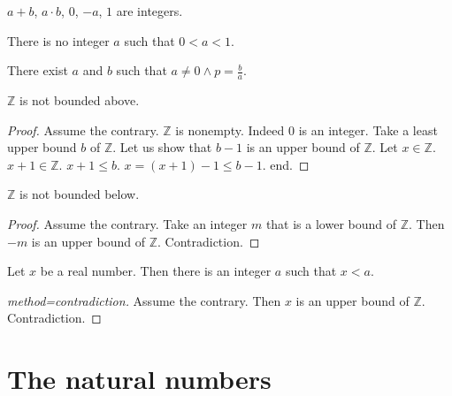 \documentclass{article}
\begin{document}
\begin{forthel}

\begin{axiom}
$a + b$, $a \cdot b$, $0$, $-a$, $1$ are integers.
\end{axiom}

\begin{axiom}
There is no integer $a$ such that $0 < a < 1$.
\end{axiom}

\begin{axiom}
There exist $a$ and $b$ such that
$a \neq 0 \wedge p = \frac{b}{a}$.
\end{axiom}

\begin{theorem}[title=Archimedes 1]
$\mathbb{Z}$ is not bounded above.
\end{theorem}
\begin{proof}
Assume the contrary.
$\mathbb{Z}$ is nonempty. Indeed $0$ is an integer.
Take a least upper bound
$b$ of $\mathbb{Z}$.
Let us show that $b - 1$ is an upper bound of $\mathbb{Z}$.
Let $x \in \mathbb{Z}$. $x + 1 \in \mathbb{Z}$.
$x + 1 \leq b$.
$x = (x + 1) - 1 \leq b - 1$.
end.
\end{proof}

\begin{theorem}
$\mathbb{Z}$ is not bounded below.
\end{theorem}
\begin{proof}
Assume the contrary.
Take an integer $m$ that is a lower bound of $\mathbb{Z}$.
Then $-m$ is an upper bound of $\mathbb{Z}$.
Contradiction.
\end{proof}

\begin{theorem}[title=Archimedes 2]
Let $x$ be a real number.
Then there is an integer $a$
such that $x < a$.\end{theorem}
\begin{proof}[method=contradiction]
Assume the contrary.
Then $x$ is an upper bound of $\mathbb{Z}$.
Contradiction.
\end{proof}

\end{forthel}


\section{The natural numbers}
\end{document}
